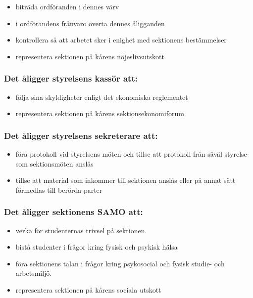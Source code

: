 \begin{itemize}
  \item biträda ordföranden i dennes värv 
  \item i ordförandens frånvaro överta dennes åligganden 
  \item kontrollera så att arbetet sker i enighet med sektionens bestämmelser 
  \item representera sektionen på kårens nöjeslivsutskott
\end{itemize}

\subsubsection{Det åligger styrelsens kassör att:}

\begin{itemize}
  \item följa sina skyldigheter enligt det ekonomiska reglementet
  \item representera sektionen på kårens sektionsekonomiforum
\end{itemize}

\subsubsection{Det åligger styrelsens sekreterare att:}

\begin{itemize}
  \item föra protokoll vid styrelsens möten och tillse att protokoll från såväl styrelse- som sektionsmöten anslås
  \item tillse att material som inkommer till sektionen anslås eller på annat sätt förmedlas till berörda parter
\end{itemize}

\subsubsection{Det åligger sektionens SAMO att:}

\begin{itemize}
    \item verka för studenternas trivsel på sektionen.
    \item bistå studenter i frågor kring fysisk och psykisk hälsa
    \item föra sektionens talan i frågor kring psykosocial och fysisk studie- och arbetsmiljö.
    \item representera sektionen på kårens sociala utskott
\end{itemize}

